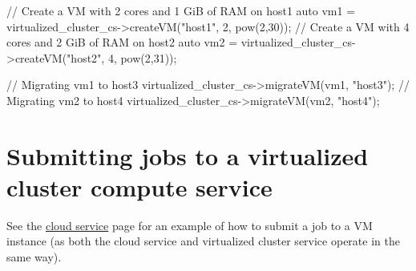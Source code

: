 \begin{DoxyCode}
\textcolor{comment}{// Create a VM with 2 cores and 1 GiB of RAM on host1}
\textcolor{keyword}{auto} vm1 = virtualized\_cluster\_cs->createVM(\textcolor{stringliteral}{"host1"}, 2, pow(2,30));
\textcolor{comment}{// Create a VM with 4 cores and 2 GiB of RAM on host2}
\textcolor{keyword}{auto} vm2 = virtualized\_cluster\_cs->createVM(\textcolor{stringliteral}{"host2"}, 4, pow(2,31));

\textcolor{comment}{// Migrating vm1 to host3}
virtualized\_cluster\_cs->migrateVM(vm1, \textcolor{stringliteral}{"host3"});
\textcolor{comment}{// Migrating vm2 to host4}
virtualized\_cluster\_cs->migrateVM(vm2, \textcolor{stringliteral}{"host4"});
\end{DoxyCode}
\hypertarget{guide-virtualizedcluster_guide-virtualizedcluster-using}{}\section{Submitting jobs to a virtualized cluster compute service}\label{guide-virtualizedcluster_guide-virtualizedcluster-using}
See the \hyperlink{guide-cloud}{cloud service} page for an example of how to submit a job to a VM instance (as both the cloud service and virtualized cluster service operate in the same way). 